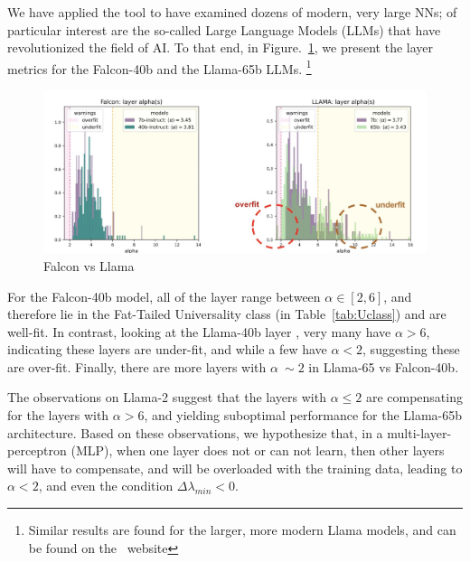 We have applied the \WW tool to have examined dozens
of modern, very large NNs; of particular interest are the so-called Large Language Models
(LLMs) that have revolutionized the field of AI.  To that end, in Figure.~\ref{fig:falcon_vs_llama},
we present the \WW layer \ALPHA metrics for the Falcon-40b and the Llama-65b LLMs.
\footnote{Similar results are found for the larger, more modern Llama models,
and can be found on the ~\WW website\cite{WW}}

\begin{figure}[ht!]
    \centering
    \includegraphics[width=15cm]{./img/falcon_vs_llama.png}
    \caption{Falcon vs Llama}
   \label{fig:falcon_vs_llama}
\end{figure}

For the Falcon-40b model, all of the layer \ALPHA range between $\alpha\in[2,6]$,
and therefore lie in the Fat-Tailed Universality class (in Table~\ref{tab:Uclass})
and are well-fit.
In contrast, looking at the Llama-40b layer \ALPHA, very many have $\alpha>6$,
indicating these layers are under-fit, and while a few have $\alpha <2$, suggesting
these are over-fit.  Finally, there are more layers with $\alpha~\sim2$ in Llama-65
vs Falcon-40b.

The observations on Llama-2 suggest that the layers with $\alpha\le 2$
are compensating for the layers with $\alpha>6$, and yielding suboptimal
performance for the Llama-65b architecture.
Based on these observations, we hypothesize that, in a multi-layer-perceptron (MLP),
when one layer does not or can not learn, then other layers will
have to compensate, and will be overloaded with the training data,
leading to $\alpha<2$, and even the \TRACELOG condition $\Delta \lambda_{min} < 0$.


